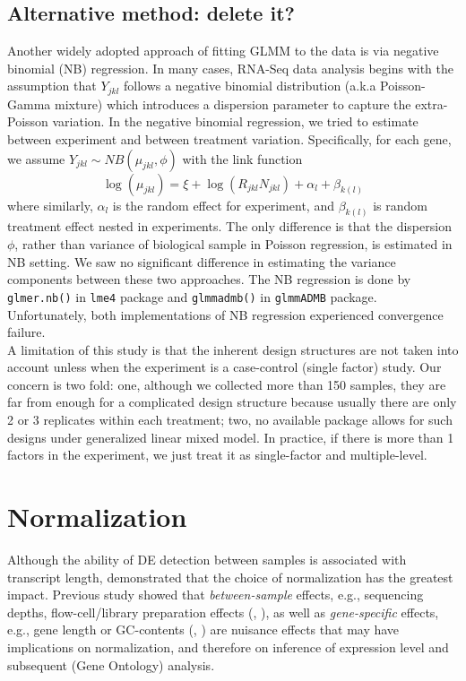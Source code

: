 \documentclass[11pt, a4paper]{article}
\begin{document}
  \subsection{Alternative method:  delete it?}
Another widely adopted approach of fitting GLMM to the data is via negative binomial (NB) regression. In many cases,  RNA-Seq data analysis begins with the assumption that $Y_{jkl}$ follows a negative binomial distribution (a.k.a Poisson-Gamma mixture) which introduces a dispersion parameter to capture the extra-Poisson variation.  In the negative binomial regression, we tried to estimate between experiment and between treatment variation. Specifically,  for each gene, we assume $Y_{jkl}\sim NB(\mu_{jkl}, \phi)$ with the link function
 \[\log(\mu_{jkl})= \xi + \log(R_{jkl}N_{jkl}) + \alpha_l + \beta_{k(l)}\]
where similarly, $\alpha_l$ is the random effect for experiment, and $\beta_{k(l)}$ is random treatment effect nested in experiments.  The only difference is that the dispersion $\phi$, rather than variance of biological sample in Poisson regression, is estimated in NB setting. We saw no significant difference in estimating the variance components between these two approaches. The NB regression is done by \verb"glmer.nb()" in \verb"lme4" package\citep{bates2012lme4} and \verb"glmmadmb()" in \verb"glmmADMB" package\citep{bolker2012getting}. Unfortunately, both implementations of NB regression experienced convergence failure. \\

A limitation of this study is that the inherent design structures are not taken into account unless when the experiment is a case-control (single factor) study. Our concern is two fold: one, although we collected more than 150 samples, they are far from enough for a complicated design structure because usually there are only 2 or 3 replicates within each treatment;  two, no available package allows for such designs under generalized linear mixed model.  In practice, if there is more than 1 factors in the experiment, we just treat it as single-factor and multiple-level. 


\section{Normalization}

Although the ability of DE detection between samples is associated with transcript length\citep{oshlack2009transcript}, \cite{bullard2010evaluation} demonstrated that the choice of normalization has the greatest impact. Previous study showed that \textit{between-sample} effects, e.g., sequencing depths, flow-cell/library preparation effects (\cite{bullard2010evaluation}, \cite{robinson2010scaling}), as well as \textit{gene-specific} effects, e.g.,  gene length or GC-contents (\cite{risso2011gc}, \cite{hansen2012removing}) are nuisance effects that may have implications on normalization, and therefore on inference of expression level and subsequent (Gene Ontology) analysis.  \\
\end{document}

